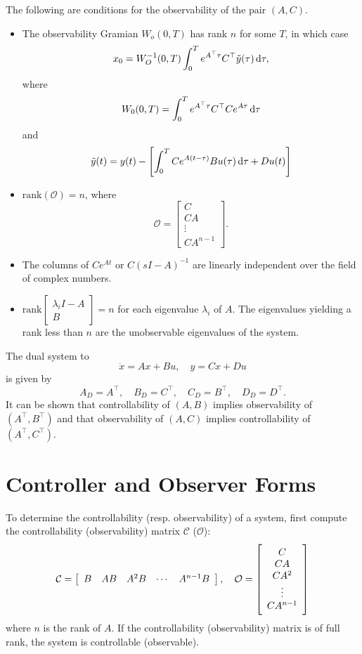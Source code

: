 \documentclass{report}
\begin{document}
The following are conditions for the observability of the pair
$(A,C)$.
\begin{itemize}
  \item{
    The observability Gramian $W_o(0, T)$ has rank $n$ for some $T$,
    in which case
    $$
    x_0 =
    W_O^{-1}(0, T)\int_0^T e^{A^\top \tau} C^\top \tilde{y}(\tau) \dif
    \tau,
    $$
    where
    $$
    W_0(0, T) = \int_0^T e^{A^\top \tau} C^\top C e^{A \tau} \dif \tau
    $$
    and
    $$
    \tilde{y}(t)
    = y(t)
    - \left[
        \int_0^T C e^{A(t - \tau)} B u(\tau) \dif \tau + D u(t)
      \right]
    $$
  }
  \item{
    $\mathrm{rank}(\mathcal{O}) = n$, where
    $$
    \mathcal{O} =
    \left[\begin{array}{c}
      C        \\
      C A      \\
      \vdots   \\
      C A^{n-1}
    \end{array}\right].
    $$
  }
  \item{
    The columns of $C e^{A t}$ or $C (sI - A)^{-1}$ are linearly independent over the field
    of complex numbers.
  }
  \item{
    $\mathrm{rank}
       \left[\begin{array}{c}
         \lambda_i I - A \\
         B
       \end{array}\right] = n$ for each eigenvalue $\lambda_i$
    of $A$. The eigenvalues yielding a rank less than $n$ are the
    unobservable eigenvalues of the system.
  }
\end{itemize}

The dual system to
$$
\dot{x} = A x + B u, \quad
y = C x + D u
$$
is given by
$$
A_D = A^\top, \quad
B_D = C^\top, \quad
C_D = B^\top, \quad
D_D = D^\top.
$$
It can be shown that controllability of $(A, B)$ implies observability
of $(A^\top, B^\top)$ and that observability of $(A, C)$ implies
controllability of $(A^\top, C^\top)$.

\section{Controller and Observer Forms}

To determine the controllability (resp. observability) of a system, first compute
the controllability (observability) matrix $\mathcal{C}$ ($\mathcal{O}$):
$$
\mathcal{C} =
\left[\begin{array}{c c c c c}
  B & A B & A^2 B & \cdots & A^{n-1} B
\end{array}\right], \quad
\mathcal{O} =
\left[\begin{array}{c}
  C        \\
  C A      \\
  C A^2    \\
  \vdots   \\
  C A^{n-1}
\end{array}\right]
$$
where $n$ is the rank of $A$. If the controllability (observability)
matrix is of full rank, the system is controllable (observable).
\end{document}
